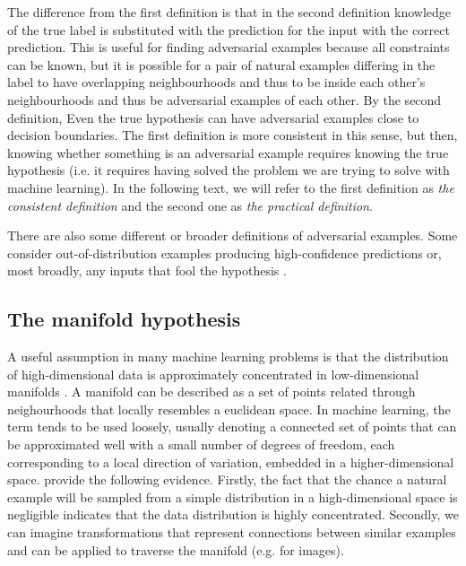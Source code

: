 \documentclass[twocolumn]{article}
\begin{document}
The difference from the first definition is that in the second definition knowledge of the true label is substituted with the prediction for the input with the correct prediction. This is useful for finding adversarial examples because all constraints can be known, but it is possible for a pair of natural examples differing in the label to have overlapping neighbourhoods and thus to be inside each other's neighbourhoods and thus be adversarial examples of each other. By the second definition, Even the true hypothesis can have adversarial examples close to decision boundaries. The first definition is more consistent in this sense, but then, knowing whether something is an adversarial example requires knowing the true hypothesis (i.e. it requires having solved the problem we are trying to solve with machine learning). In the following text, we will refer to the first definition as \textit{the consistent definition} and the second one as \textit{the practical definition}.

There are also some different or broader definitions of adversarial examples. Some consider out-of-distribution examples producing high-confidence predictions \citep{Gal:2018:SCIMHNAETESBNN} or, most broadly, any inputs that fool the hypothesis \citep{Brown:2018:UAE}.


\subsection{The manifold hypothesis}

A useful assumption in many machine learning problems is that the distribution of high-dimensional data is approximately concentrated in low-dimensional manifolds \citep{Goodfellow:2016:DL}. A manifold can be described as a set of points related through neighourhoods that locally resembles a euclidean space. In machine learning, the term tends to be used loosely, usually denoting a connected set of points that can be approximated well with a small number of degrees of freedom, each corresponding to a local direction of variation, embedded in a higher-dimensional space. 
\citep{Goodfellow:2016:DL} provide the following evidence. Firstly, the fact that the chance a natural example will be sampled from a simple distribution in a high-dimensional space is negligible indicates that the data distribution is highly concentrated. Secondly, we can imagine transformations that represent connections between similar examples and can be applied to traverse the manifold (e.g. for images).
\end{document}

